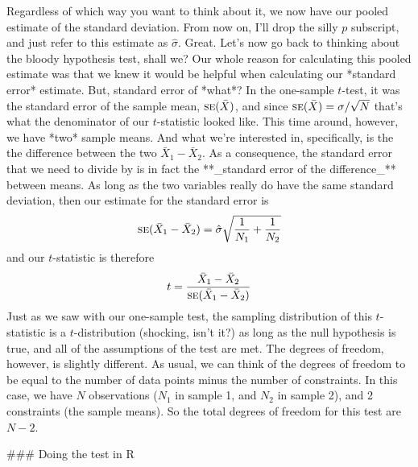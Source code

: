 Regardless of which way you want to think about it, we now have our pooled estimate of the standard deviation. From now on, I'll drop the silly $p$ subscript, and just refer to this estimate as $\hat\sigma$. Great. Let's now go back to thinking about the bloody hypothesis test, shall we? Our whole reason for calculating this pooled estimate was that we knew it would be helpful when calculating our *standard error* estimate. But, standard error of *what*? In the one-sample $t$-test, it was the standard error of the sample mean, $\mbox{\textsc{se}}(\bar{X})$, and since $\mbox{\textsc{se}}(\bar{X}) = \sigma / \sqrt{N}$ that's what the denominator of our $t$-statistic looked like. This time around, however, we have *two* sample means. And what we're interested in, specifically, is the the difference between the two $\bar{X}_1 - \bar{X}_2$. As a consequence, the standard error that we need to divide by is in fact the **_standard error of the difference_** between means. As long as the two variables really do have the same standard deviation, then our estimate for the standard error is
$$
\mbox{\textsc{se}}(\bar{X}_1 - \bar{X}_2) = \hat\sigma \sqrt{\frac{1}{N_1} + \frac{1}{N_2}}
$$
and our $t$-statistic is therefore 
$$
t = \frac{\bar{X}_1 - \bar{X}_2}{\mbox{\textsc{se}}(\bar{X}_1 - \bar{X}_2)}
$$
Just as we saw with our one-sample test, the sampling distribution of this $t$-statistic is a $t$-distribution (shocking, isn't it?) as long as the null hypothesis is true, and all of the assumptions of the test are met. The degrees of freedom, however, is slightly different. As usual, we can think of the degrees of freedom to be equal to the number of data points minus the number of constraints. In this case, we have $N$ observations ($N_1$ in sample 1, and $N_2$ in sample 2), and 2 constraints (the sample means). So the total degrees of freedom for this test are $N-2$. 


### Doing the test in R

